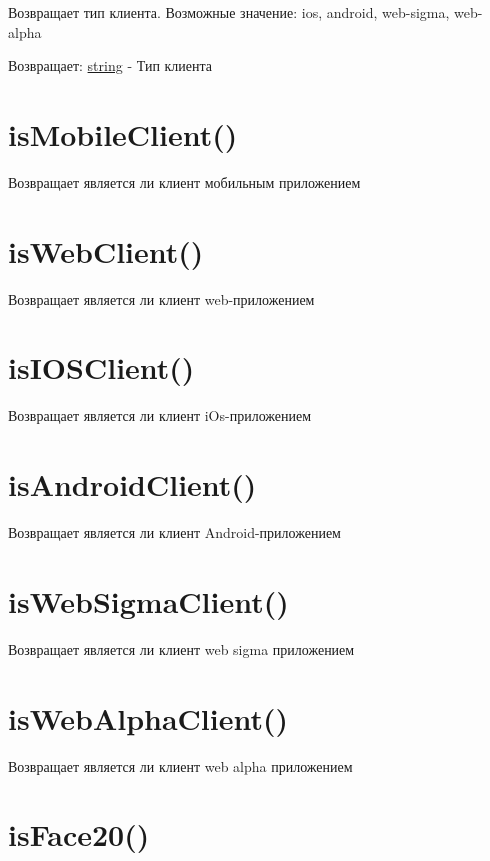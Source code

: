 Возвращает тип клиента. Возможные значение: ios, android, web-sigma,
web-alpha

Возвращает: \protect\hyperlink{string}{string} - Тип клиента\\

\hypertarget{ismobileclient-boolean}{%
\section{isMobileClient()}\label{ismobileclient-boolean}}

Возвращает является ли клиент мобильным приложением


\hypertarget{iswebclient-boolean}{%
\section{isWebClient()}\label{iswebclient-boolean}}

Возвращает является ли клиент web-приложением


\hypertarget{isiosclient-boolean}{%
\section{isIOSClient()}\label{isiosclient-boolean}}

Возвращает является ли клиент iOs-приложением


\hypertarget{isandroidclient-boolean}{%
\section{isAndroidClient()}\label{isandroidclient-boolean}}

Возвращает является ли клиент Android-приложением


\hypertarget{iswebsigmaclient-boolean}{%
\section{isWebSigmaClient()}\label{iswebsigmaclient-boolean}}

Возвращает является ли клиент web sigma приложением


\hypertarget{iswebalphaclient-boolean}{%
\section{isWebAlphaClient()}\label{iswebalphaclient-boolean}}

Возвращает является ли клиент web alpha приложением


\hypertarget{isface20}{%
\section{isFace20()}\label{isface20}}

